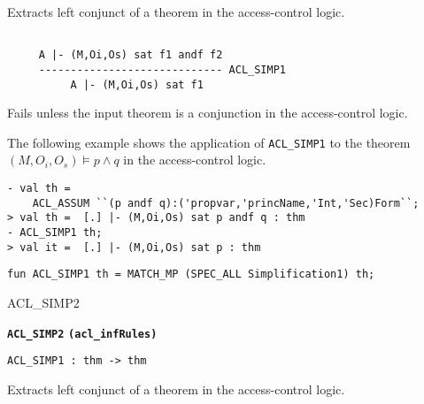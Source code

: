 \SYNOPSIS
Extracts left conjunct of a theorem in the access-control logic.

\DESCRIBE
\begin{verbatim}

     A |- (M,Oi,Os) sat f1 andf f2
     ----------------------------- ACL_SIMP1
          A |- (M,Oi,Os) sat f1
\end{verbatim}

\FAILURE
Fails unless the input theorem is a conjunction in the
access-control logic.

\EXAMPLE The following example shows the application of
\texttt{ACL\_SIMP1} to the theorem $(M,O_i,O_s) \models p \wedge q$ in
the access-control logic.
\begin{holboxed}
\begin{verbatim}
- val th = 
    ACL_ASSUM ``(p andf q):('propvar,'princName,'Int,'Sec)Form``;
> val th =  [.] |- (M,Oi,Os) sat p andf q : thm
- ACL_SIMP1 th;
> val it =  [.] |- (M,Oi,Os) sat p : thm
\end{verbatim}
\end{holboxed}

\IMPLEMENTATION
\begin{holboxed}
\begin{verbatim}
fun ACL_SIMP1 th = MATCH_MP (SPEC_ALL Simplification1) th;
\end{verbatim}
\end{holboxed}

\SEEALSO
ACL\_SIMP2
\ENDDOC

\begin{holboxed}
  \begin{Large}
    \textbf{\texttt{ACL\_SIMP2}} \hfill{}\textbf{\texttt{(acl\_infRules)}}
  \end{Large}
\end{holboxed}
\begin{verbatim}
ACL_SIMP1 : thm -> thm
\end{verbatim}

\SYNOPSIS
Extracts left conjunct of a theorem in the access-control logic.


